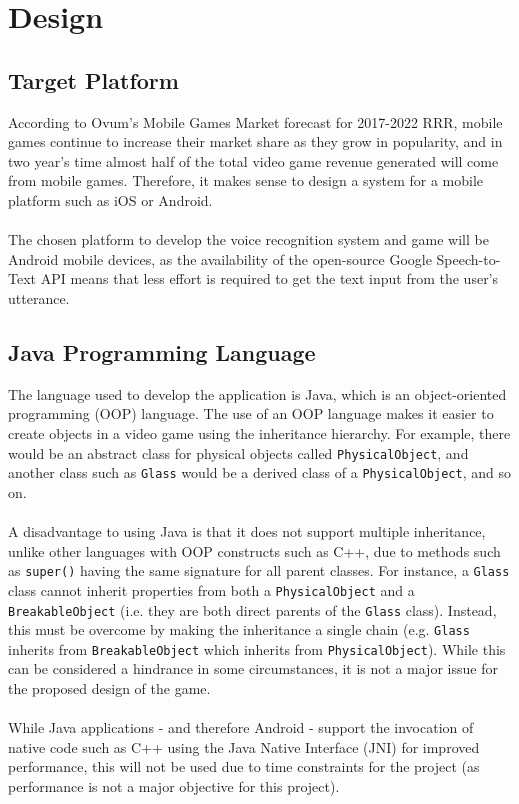 \documentclass[12pt]{article}
\begin{document}
\section{Design}
\subsection{Target Platform}

According to Ovum's Mobile Games Market forecast for 2017-2022 RRR, mobile games continue to increase their market share as they grow in popularity, and in two year's time almost half of the total video game revenue generated will come from mobile games. Therefore, it makes sense to design a system for a mobile platform such as iOS or Android.
\\
\\
The chosen platform to develop the voice recognition system and game will be Android mobile devices, as the availability of the open-source Google Speech-to-Text API means that less effort is required to get the text input from the user's utterance.

\subsection{Java Programming Language}

The language used to develop the application is Java, which is an object-oriented programming (OOP) language. The use of an OOP language makes it easier to create objects in a video game using the inheritance hierarchy. For example, there would be an abstract class for physical objects called \texttt{PhysicalObject}, and another class such as \texttt{Glass} would be a derived class of a \texttt{PhysicalObject}, and so on.
\\
\\
A disadvantage to using Java is that it does not support multiple inheritance, unlike other languages with OOP constructs such as C++, due to methods such as \texttt{super()} having the same signature for all parent classes. For instance, a \texttt{Glass} class cannot inherit properties from both a \texttt{PhysicalObject} and a \texttt{BreakableObject} (i.e. they are both direct parents of the \texttt{Glass} class). Instead, this must be overcome by making the inheritance a single chain (e.g. \texttt{Glass} inherits from \texttt{BreakableObject} which inherits from \texttt{PhysicalObject}). While this can be considered a hindrance in some circumstances, it is not a major issue for the proposed design of the game.
\\
\\
While Java applications - and therefore Android - support the invocation of native code such as C++ using the Java Native Interface (JNI) for improved performance, this will not be used due to time constraints for the project (as performance is not a major objective for this project).
\end{document}

